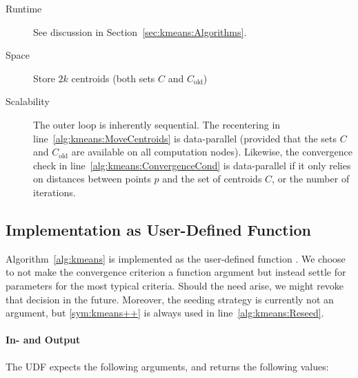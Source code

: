 \begin{description}
	\item[Runtime] See discussion in Section~\ref{sec:kmeans:Algorithms}.
	\item[Space] Store $2k$ centroids (both sets $C$ and $C_\text{old}$)
	\item[Scalability] The outer loop is inherently sequential. The recentering in line~\ref{alg:kmeans:MoveCentroids} is data-parallel (provided that the sets $C$ and $C_\text{old}$ are available on all computation nodes). Likewise, the convergence check in line~\ref{alg:kmeans:ConvergenceCond} is data-parallel if it only relies on distances between points $p$ and the set of centroids $C$, or the number of iterations.
\end{description}

\subsection{Implementation as User-Defined Function}

Algorithm~\ref{alg:kmeans} is implemented as the user-defined function . We choose to not make the convergence criterion a function argument but instead settle for parameters for the most typical criteria. Should the need arise, we might revoke that decision in the future. Moreover, the seeding strategy is currently not an argument, but \ref{sym:kmeans++} is always used in line~\ref{alg:kmeans:Reseed}.

\paragraph{In- and Output} The UDF expects the following arguments, and returns the following values:

